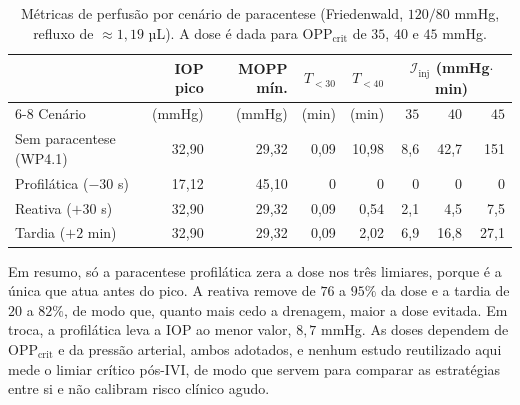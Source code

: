 \begin{table}[h]
\centering
\caption{Métricas de perfusão por cenário de paracentese (Friedenwald, $120/80$ mmHg, refluxo de $\approx1{,}19$ µL). A dose é dada para $\mathrm{OPP}_{\text{crit}}$ de $35$, $40$ e $45$ mmHg.}
\label{tab_wp46_par}
\small
\begin{tabular}{@{}lrrrrrrr@{}}
\toprule
 & IOP pico & MOPP mín. & $T_{<30}$ & $T_{<40}$ & \multicolumn{3}{c}{$\mathcal{I}_{\mathrm{inj}}$ (mmHg$\cdot$min)} \\
\cmidrule(l){6-8}
Cenário & (mmHg) & (mmHg) & (min) & (min) & $35$ & $40$ & $45$ \\
\midrule
Sem paracentese (WP4.1) & 32,90 & 29,32 & 0,09 & 10,98 & 8,6 & 42,7 & 151 \\
Profilática ($-30$ s) & 17,12 & 45,10 & 0 & 0 & 0 & 0 & 0 \\
Reativa ($+30$ s) & 32,90 & 29,32 & 0,09 & 0,54 & 2,1 & 4,5 & 7,5 \\
Tardia ($+2$ min) & 32,90 & 29,32 & 0,09 & 2,02 & 6,9 & 16,8 & 27,1 \\
\bottomrule
\end{tabular}
\end{table}

Em resumo, só a paracentese profilática zera a dose nos três limiares, porque é a única que atua antes do pico. A reativa remove de $76$ a $95\%$ da dose e a tardia de $20$ a $82\%$, de modo que, quanto mais cedo a drenagem, maior a dose evitada. Em troca, a profilática leva a IOP ao menor valor, $8{,}7$ mmHg. As doses dependem de $\mathrm{OPP}_{\text{crit}}$ e da pressão arterial, ambos adotados, e nenhum estudo reutilizado aqui mede o limiar crítico pós-IVI, de modo que servem para comparar as estratégias entre si e não calibram risco clínico agudo.
